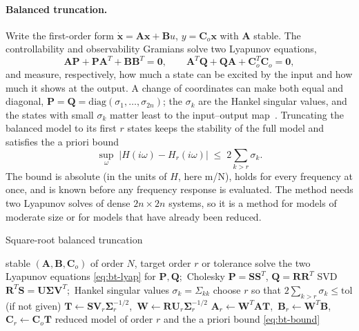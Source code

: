 \paragraph{Balanced truncation.}
Write the first-order form $\dot{\bm x}=\bm A\bm x+\bm B u$, $y=\bm C_o\bm x$ with $\bm A$ stable. The controllability and observability Gramians solve two Lyapunov equations,
\begin{equation}\label{eq:bt-lyap}
\bm A\bm P+\bm P\bm A^T+\bm B\bm B^T=\bm 0,\qquad \bm A^T\bm Q+\bm Q\bm A+\bm C_o^T\bm C_o=\bm 0 ,
\end{equation}
and measure, respectively, how much a state can be excited by the input and how much it shows at the output. A change of coordinates can make both equal and diagonal, $\bm P=\bm Q=\mathrm{diag}(\sigma_1,\dots,\sigma_{2n})$; the $\sigma_k$ are the Hankel singular values, and the states with small $\sigma_k$ matter least to the input--output map~\cite{moore1981,antoulas2005}. Truncating the balanced model to its first $r$ states keeps the stability of the full model and satisfies the a priori bound~\cite{enns1984,glover1984}
\begin{equation}\label{eq:bt-bound}
\sup_{\omega}\;|H(i\omega)-H_r(i\omega)|\;\le\;2\sum_{k>r}\sigma_k .
\end{equation}
The bound is absolute (in the units of $H$, here m/N), holds for every frequency at once, and is known before any frequency response is evaluated. The method needs two Lyapunov solves of dense $2n\times2n$ systems, so it is a method for models of moderate size or for models that have already been reduced.

\begin{algbox}{Square-root balanced truncation}
\begin{pseudo}
\Require stable $(\bm A,\bm B,\bm C_o)$ of order $N$, target order $r$ or tolerance
\State solve the two Lyapunov equations \eqref{eq:bt-lyap} for $\bm P,\bm Q$;\ Cholesky $\bm P=\bm S\bm S^T$, $\bm Q=\bm R\bm R^T$
\State SVD $\bm R^T\bm S=\bm U\bm\Sigma\bm V^T$;\ Hankel singular values $\sigma_k=\Sigma_{kk}$
\State choose $r$ so that $2\sum_{k>r}\sigma_k\le\mathrm{tol}$ (if not given)
\State $\bm T\gets\bm S\bm V_r\bm\Sigma_r^{-1/2}$,\ $\bm W\gets\bm R\bm U_r\bm\Sigma_r^{-1/2}$
\State $\bm A_r\gets\bm W^T\bm A\bm T$,\ $\bm B_r\gets\bm W^T\bm B$,\ $\bm C_r\gets\bm C_o\bm T$
\Ensure reduced model of order $r$ and the a priori bound \eqref{eq:bt-bound}
\end{pseudo}
\end{algbox}

